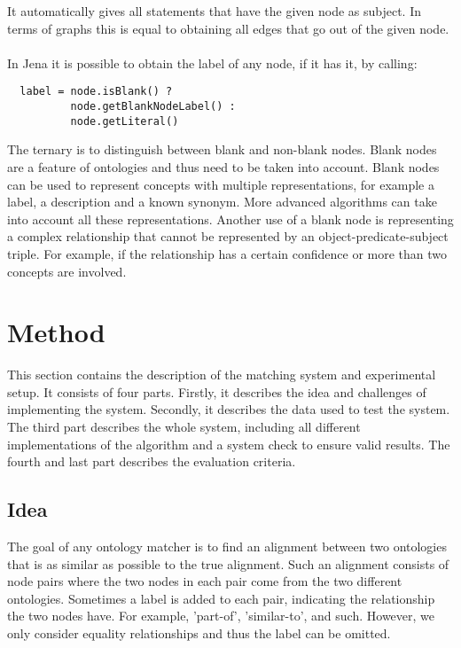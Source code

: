 \documentclass{article}
\begin{document}
 It automatically gives all statements that have the given node as subject. In terms of graphs this is equal to obtaining all edges that go out of the given node.
 \paragraph{}
 In Jena it is possible to obtain the label of any node, if it has it, by calling:
 
 \lstset{language=Java}
 \begin{lstlisting}
  label = node.isBlank() ? 
  		  node.getBlankNodeLabel() : 
  		  node.getLiteral()
 \end{lstlisting}
 
 The ternary is to distinguish between blank and non-blank nodes. Blank nodes are a feature of ontologies and thus need to be taken into account. Blank nodes can be used to represent concepts with multiple representations, for example a label, a description and a known synonym. More advanced algorithms can take into account all these representations. Another use of a blank node is representing a complex relationship that cannot be represented by an object-predicate-subject triple. For example, if the relationship has a certain confidence or more than two concepts are involved.
 
 \newpage
 \section{Method} 
 This section contains the description of the matching system and experimental setup. It consists of four parts. Firstly, it describes the idea and challenges of implementing the system. Secondly, it describes the data used to test the system. The third part describes the whole system, including all different implementations of the algorithm and a system check to ensure valid results. The fourth and last part describes the evaluation criteria.
 
 \subsection{Idea}
The goal of any ontology matcher is to find an alignment between two ontologies that is as similar as possible to the true alignment. Such an alignment consists of node pairs where the two nodes in each pair come from the two different ontologies. Sometimes a label is added to each pair, indicating the relationship the two nodes have. For example, 'part-of', 'similar-to', and such. However, we only consider equality relationships and thus the label can be omitted.
\end{document}
